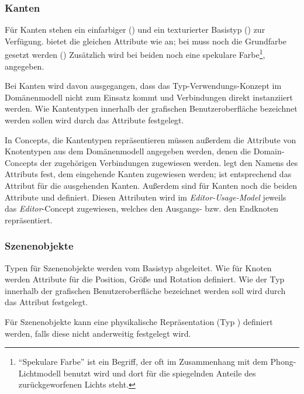 \documentclass[a4paper,10pt]{sphinxmanual}
\begin{document}
\subsubsection{Kanten}
\label{metamodelle:ebl-figures-kanten}\label{metamodelle:kanten}
Für Kanten stehen ein einfarbiger () und ein texturierter Basistyp () zur Verfügung.
 bietet die gleichen Attribute wie  an; bei  muss noch die Grundfarbe gesetzt werden ()
Zusätzlich wird bei beiden noch eine spekulare Farbe\footnote{
"`Spekulare Farbe"' ist ein Begriff, der oft im Zusammenhang mit dem Phong-Lichtmodell \cite{phong_illumination_1975} benutzt wird und dort für die spiegelnden Anteile des zurückgeworfenen Lichts steht.
},  angegeben.

Bei Kanten wird davon ausgegangen, dass das Typ-Verwendungs-Konzept im Domänenmodell nicht zum Einsatz kommt und Verbindungen direkt instanziiert werden.
Wie Kantentypen innerhalb der grafischen Benutzeroberfläche bezeichnet werden sollen wird durch das Attribute  festgelegt.

In Concepts, die Kantentypen repräsentieren müssen außerdem die Attribute von Knotentypen aus dem Domänenmodell angegeben werden, denen die Domain-Concepts der zugehörigen Verbindungen zugewiesen werden.
 legt den Namens des Attributs fest, dem eingehende Kanten zugewiesen werden;  ist entsprechend das Attribut für die ausgehenden Kanten.
Außerdem sind für Kanten noch die beiden Attribute  und  definiert. Diesen Attributen wird im \emph{Editor-Usage-Model} jeweils das \emph{Editor}-Concept zugewiesen, welches den Ausgangs- bzw. den Endknoten repräsentiert.


\subsubsection{Szenenobjekte}
\label{metamodelle:szenenobjekte}
Typen für Szenenobjekte werden vom Basistyp  abgeleitet. Wie für Knoten werden Attribute für die Position, Größe und Rotation definiert.
Wie der Typ innerhalb der grafischen Benutzeroberfläche bezeichnet werden soll wird durch das Attribut  festgelegt.

Für Szenenobjekte kann eine physikalische Repräsentation (Typ ) definiert werden, falls diese nicht anderweitig festgelegt wird.
\end{document}

